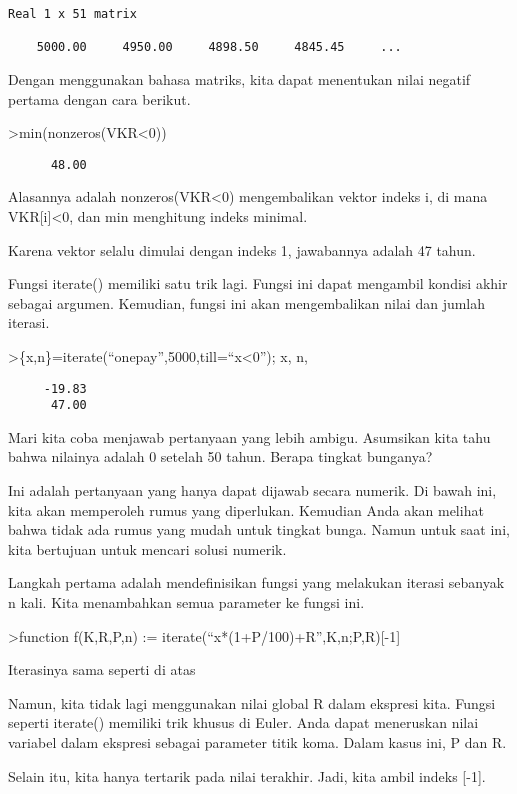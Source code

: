 \documentclass[
]{book}
\begin{document}
\begin{verbatim}
Real 1 x 51 matrix

    5000.00     4950.00     4898.50     4845.45     ...
\end{verbatim}

Dengan menggunakan bahasa matriks, kita dapat menentukan nilai negatif pertama dengan cara berikut.

\textgreater min(nonzeros(VKR\textless0))

\begin{verbatim}
      48.00 
\end{verbatim}

Alasannya adalah nonzeros(VKR\textless0) mengembalikan vektor indeks i, di mana VKR{[}i{]}\textless0, dan min menghitung indeks minimal.

Karena vektor selalu dimulai dengan indeks 1, jawabannya adalah 47 tahun.

Fungsi iterate() memiliki satu trik lagi. Fungsi ini dapat mengambil kondisi akhir sebagai argumen. Kemudian, fungsi ini akan mengembalikan nilai dan jumlah iterasi.

\textgreater\{x,n\}=iterate(``onepay'',5000,till=``x\textless0''); x, n,

\begin{verbatim}
     -19.83 
      47.00 
\end{verbatim}

Mari kita coba menjawab pertanyaan yang lebih ambigu. Asumsikan kita tahu bahwa nilainya adalah 0 setelah 50 tahun. Berapa tingkat bunganya?

Ini adalah pertanyaan yang hanya dapat dijawab secara numerik. Di bawah ini, kita akan memperoleh rumus yang diperlukan. Kemudian Anda akan melihat bahwa tidak ada rumus yang mudah untuk tingkat bunga. Namun untuk saat ini, kita bertujuan untuk mencari solusi numerik.

Langkah pertama adalah mendefinisikan fungsi yang melakukan iterasi sebanyak n kali. Kita menambahkan semua parameter ke fungsi ini.

\textgreater function f(K,R,P,n) := iterate(``x*(1+P/100)+R'',K,n;P,R){[}-1{]}

Iterasinya sama seperti di atas

Namun, kita tidak lagi menggunakan nilai global R dalam ekspresi kita. Fungsi seperti iterate() memiliki trik khusus di Euler. Anda dapat meneruskan nilai variabel dalam ekspresi sebagai parameter titik koma. Dalam kasus ini, P dan R.

Selain itu, kita hanya tertarik pada nilai terakhir. Jadi, kita ambil indeks {[}-1{]}.
\end{document}

